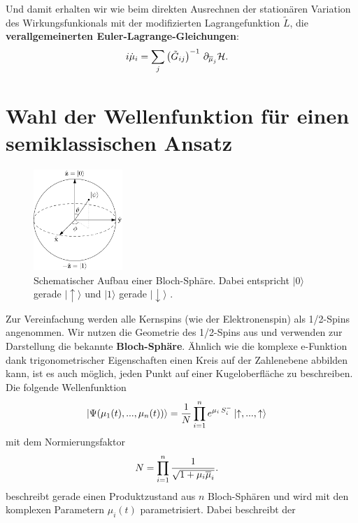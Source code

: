 Und damit erhalten wir wie beim direkten Ausrechnen der stationären Variation des Wirkungsfunkionals mit der modifizierten 
Lagrangefunktion $\widetilde{L}$, die \textbf{verallgemeinerten Euler-Lagrange-Gleichungen}:
\begin{align}\label{verallgemeinerter_Euler_Lagrange}
    i\dot{\mu}_i &= \sum_{j}\left(\tilde{G}_{ij}\right)^{-1}\thinspace \partial_{\overline{\mu}_j}\mathcal{{H}}.
\end{align}
\newpage
\section{Wahl der Wellenfunktion für einen semiklassischen Ansatz}
\begin{figure}
    \centering
    \includegraphics[width = 0.3\textwidth]{Abbildungen/Bloch_sphere_wikimedia.png}
    \caption{Schematischer Aufbau einer Bloch-Sphäre. Dabei entspricht $|0\rangle$  gerade $|\uparrow\rangle$ und $|1\rangle$ gerade 
    $|\downarrow\rangle$ \cite{pict}.}
    \label{fig:qubit}
\end{figure}
Zur Vereinfachung werden alle Kernspins (wie der Elektronenspin) als 1/2-Spins angenommen. 
Wir nutzen die Geometrie des 1/2-Spins aus und verwenden zur Darstellung die bekannte \textbf{Bloch-Sphäre}. 
Ähnlich wie die komplexe e-Funktion dank trigonometrischer Eigenschaften einen Kreis auf der Zahlenebene abbilden kann, ist es auch möglich,
jeden Punkt auf einer Kugeloberfläche zu beschreiben. Die folgende Wellenfunktion 
\begin{align}\label{klassischer_Ansatz}
    \ket{\Psi(\mu_1(t),...,\mu_n(t))} &= \frac{1}{N}\prod_{i=1}^{n} e^{\mu_i\thinspace S_i^-}\ket{\uparrow,...,\uparrow}
\end{align}
mit dem Normierungsfaktor
\begin{align}
    N &= \prod_{i=1}^{n} \frac{1}{\sqrt{1+\mu_i\overline{\mu}_i}}.
\end{align}
beschreibt gerade einen Produktzustand aus $n$ Bloch-Sphären und wird mit den komplexen Parametern $\mu_i(t)$ parametrisiert. Dabei beschreibt der
